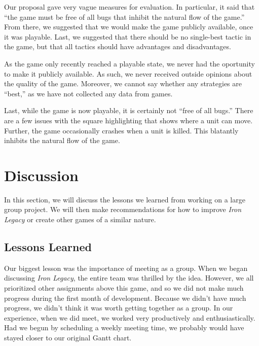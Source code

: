 \documentclass{article}
\begin{document}
Our proposal gave very vague measures for evaluation.
    In particular, it said that ``the game must be free of all bugs that
    inhibit the natural flow of the game.''
    From there, we suggested that we would make the game publicly available,
    once it was playable.
    Last, we suggested that there should be no single-best tactic in the game,
    but that all tactics should have advantages and disadvantages.

As the game only recently reached a playable state,
    we never had the oportunity to make it publicly available.
    As such, we never received outside opinions about the quality of the game.
    Moreover, we cannot say whether any strategies are ``best,''
    as we have not collected any data from games.

Last, while the game is now playable, it is certainly not ``free of all bugs.''
    There are a few issues with the square highlighting that shows
    where a unit can move.
    Further, the game occasionally crashes when a unit is killed.
    This blatantly inhibits the natural flow of the game.

\section*{Discussion}

In this section, we will discuss the lessons we learned from working 
    on a large group project.
    We will then make recommendations for how to improve \emph{Iron Legacy}
    or create other games of a similar nature.

\subsection*{Lessons Learned}

Our biggest lesson was the importance of meeting as a group.
    When we began discussing \emph{Iron Legacy}, the entire team was thrilled
    by the idea.
    However, we all prioritized other assignments above this game,
    and so we did not make much progress during the first month of development.
    Because we didn't have much progress, we didn't think it was worth
    getting together as a group.
    In our experience, when we did meet, we worked very productively
    and enthusiastically.
    Had we begun by scheduling a weekly meeting time,
    we probably would have stayed closer to our original Gantt chart.
\end{document}
